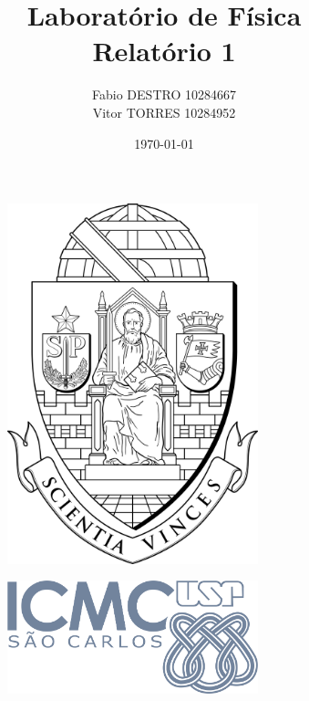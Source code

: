 \documentclass{article}
\title{
{\huge Laboratório de Física}\\{\Large Relatório 1}}
\author{Fabio DESTRO 10284667\\Vitor TORRES 10284952\\}
\date{\today}
\begin{document}
\begin{figure}[t]
    \begin{subfigure}{0.49\textwidth}
        \centering
        \includegraphics[width=0.8\textwidth]{brasao_usp_pb.png}
    \end{subfigure}
    \hfill
    \begin{subfigure}{0.49\textwidth}
       \centering
        \includegraphics[width=0.8\textwidth]{LOGO_ICMC_RGB.png}
    \end{subfigure}
\end{figure}
\end{document}
